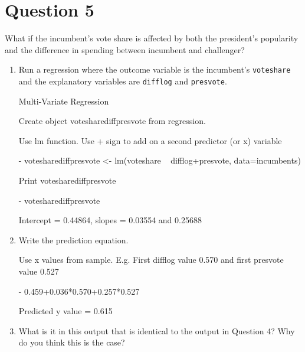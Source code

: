 \documentclass[12pt,letterpaper]{article}
\begin{document}
\section*{Question 5}%
\noindent What if the incumbent's vote share is affected by both the president's popularity and the difference in spending between incumbent and challenger? 
	\begin{enumerate}
		\item Run a regression where the outcome variable is the incumbent's \texttt{voteshare} and the explanatory variables are \texttt{difflog} and \texttt{presvote}.	\vspace{5cm}
		
		Multi-Variate Regression 
	
	Create object votesharediffpresvote from regression. 
	
	Use lm function. Use + sign to add on a second predictor (or x) variable
	
- votesharediffpresvote <- lm(voteshare ~ difflog+presvote, data=incumbents)

Print votesharediffpresvote

-	votesharediffpresvote 

Intercept = 0.44864, slopes = 0.03554 and 0.25688

		\item Write the prediction equation.	\vspace{5cm}
		
		Use x values from sample. E.g. First difflog value 0.570 and first presvote value 0.527

	-	0.459+0.036*0.570+0.257*0.527
	
	Predicted y value = 0.615
		
		\item What is it in this output that is identical to the output in Question 4? Why do you think this is the case?%
	\end{enumerate}
\end{document}

